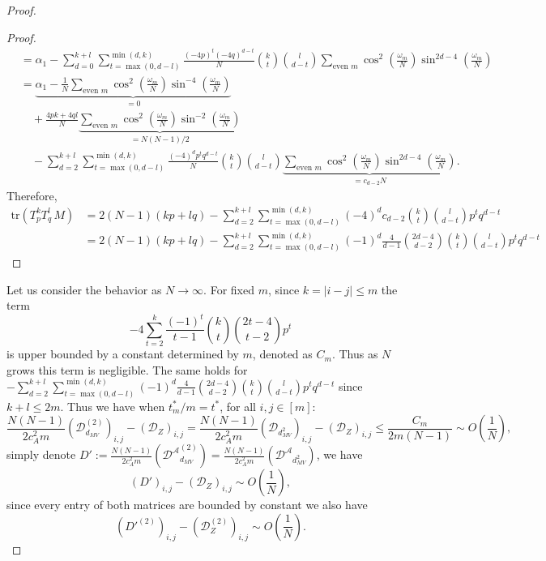 \documentclass[12pt]{article}
\theoremstyle{definition}
\begin{document}
\begin{proof}
\begin{proof}
\begin{align*}
&= \alpha_1 -\sum_{d=0}^{k+l}\sum_{t=\max(0,d-l)}^{\min(d,k)}\frac{(-4p)^t(-4q)^{d-t}}{N}\binom{k}{t}\binom{l}{d-t}\sum_{\text{even }m}\cos^2\left(\frac{\omega_m}{N}\right)\sin^{2d-4}\left(\frac{\omega_m}{N}\right)\\
&= \underbrace{\alpha_1 -\frac{1}{N}\sum_{\text{even }m}\cos^2\left(\frac{\omega_m}{N}\right)\sin^{-4}\left(\frac{\omega_m}{N}\right)}_{=0}\\
&\quad +\frac{4pk+4ql}{N}\underbrace{\sum_{\text{even }m}\cos^2\left(\frac{\omega_m}{N}\right)\sin^{-2}\left(\frac{\omega_m}{N}\right)}_{=N(N-1)/2}\\
&\quad -\sum_{d=2}^{k+l}\sum_{t=\max(0,d-l)}^{\min(d,k)}\frac{(-4)^{d}p^tq^{d-t}}{N}\binom{k}{t}\binom{l}{d-t}\underbrace{\sum_{\text{even }m}\cos^2\left(\frac{\omega_m}{N}\right)\sin^{2d-4}\left(\frac{\omega_m}{N}\right)}_{=c_{d-2}N}.
\end{align*}
Therefore,
\begin{align*}
\mathrm{tr }(T_p^kT_q^l\,M) &= 2(N-1)(kp+lq) -\sum_{d=2}^{k+l}\sum_{t=\max(0,d-l)}^{\min(d,k)}(-4)^{d}c_{d-2}\binom{k}{t}\binom{l}{d-t}p^tq^{d-t}\\
&= 2(N-1)(kp+lq)  -\sum_{d=2}^{k+l}\sum_{t=\max(0,d-l)}^{\min(d,k)}(-1)^{d}\frac{4}{d-1} \binom{2d-4}{d-2}\binom{k}{t}\binom{l}{d-t}p^tq^{d-t}
\end{align*}
\end{proof}



Let us consider the behavior as $N \to \infty$. For fixed $m$, since $k = |i-j| \leq m$ the term $$
-4\sum_{t=2}^k\frac{(-1)^t}{t-1}\binom{k}{t} \binom{2t-4}{t-2}p^t $$
is upper bounded by a constant determined by $m$, denoted as $C_m$. Thus as $N$ grows this term is negligible. The same holds for $ -\sum_{d=2}^{k+l}\sum_{t=\max(0,d-l)}^{\min(d,k)}(-1)^{d}\frac{4}{d-1} \binom{2d-4}{d-2}\binom{k}{t}\binom{l}{d-t}p^tq^{d-t}$ since $k + l \leq 2m$. Thus we have when $t^*_m/m = t^*$, for all $i,j\in [m]$:
$$
\frac{N(N-1)}{2c_A^2m}\left(\mathcal{D}^{(2)}_{d_{MV}}\right)_{i,j} - \left(\mathcal{D}_Z\right)_{i,j} = 
\frac{N(N-1)}{2c_A^2m}\left(\mathcal{D}_{d^2_{MV}}\right)_{i,j} - \left(\mathcal{D}_Z\right)_{i,j} 
\leq \frac{C_m}{2m(N-1)} \sim O\left(\frac{1}{N}\right), 
$$ simply denote $D' := \frac{N(N-1)}{2c_A^2m}\left(\mathcal{D^A}^{(2)}_{d_{MV}}\right) = \frac{N(N-1)}{2c_A^2m}\left(\mathcal{D^A}_{d^2_{MV}}\right)$, we have
$$
\left(D'\right)_{i,j} - \left(\mathcal{D}_Z\right)_{i,j} \sim O\left(\frac{1}{N}\right),
$$
since every entry of both matrices are bounded by constant we also have
$$
\left(D'^{(2)}\right)_{i,j} - \left(\mathcal{D}^{(2)}_Z\right)_{i,j} \sim O\left(\frac{1}{N}\right).
$$


\end{proof}
\end{document}
